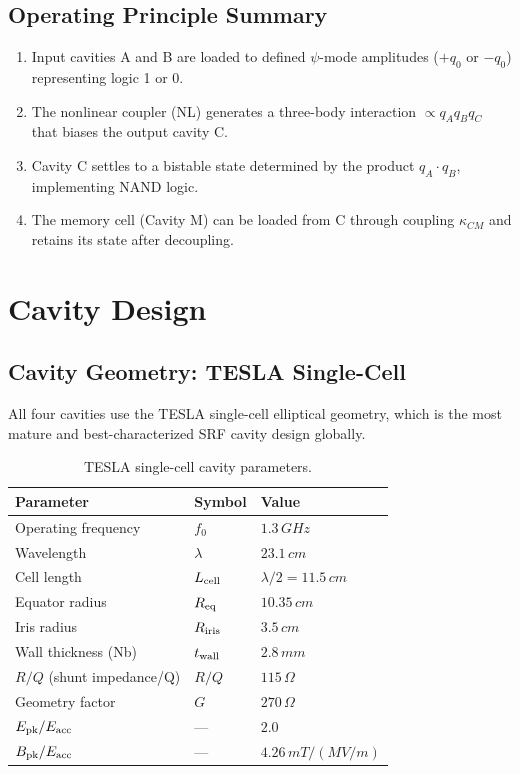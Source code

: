 \documentclass[12pt,a4paper]{article}
\begin{document}
\subsection{Operating Principle Summary}

\begin{enumerate}
\item Input cavities A and B are loaded to defined $\psi$-mode amplitudes ($+q_0$ or $-q_0$) representing logic 1 or 0.
\item The nonlinear coupler (NL) generates a three-body interaction $\propto q_A q_B q_C$ that biases the output cavity C.
\item Cavity C settles to a bistable state determined by the product $q_A \cdot q_B$, implementing NAND logic.
\item The memory cell (Cavity M) can be loaded from C through coupling $\kappa_{CM}$ and retains its state after decoupling.
\end{enumerate}

\section{Cavity Design}

\subsection{Cavity Geometry: TESLA Single-Cell}

All four cavities use the TESLA single-cell elliptical geometry, which is the most mature and best-characterized SRF cavity design globally.

\begin{table}[H]
\centering
\caption{TESLA single-cell cavity parameters.}
\label{tab:tesla}
\begin{tabular}{lll}
\toprule
\textbf{Parameter} & \textbf{Symbol} & \textbf{Value} \\
\midrule
Operating frequency & $f_0$ & $1.3\,\si{GHz}$ \\
Wavelength & $\lambda$ & $23.1\,\si{cm}$ \\
Cell length & $L_{\rm cell}$ & $\lambda/2 = 11.5\,\si{cm}$ \\
Equator radius & $R_{\rm eq}$ & $10.35\,\si{cm}$ \\
Iris radius & $R_{\rm iris}$ & $3.5\,\si{cm}$ \\
Wall thickness (Nb) & $t_{\rm wall}$ & $2.8\,\si{mm}$ \\
$R/Q$ (shunt impedance/Q) & $R/Q$ & $115\,\si{\Omega}$ \\
Geometry factor & $G$ & $270\,\si{\Omega}$ \\
$E_{\rm pk}/E_{\rm acc}$ & --- & $2.0$ \\
$B_{\rm pk}/E_{\rm acc}$ & --- & $4.26\,\si{mT/(MV/m)}$ \\
\bottomrule
\end{tabular}
\end{table}
\end{document}
